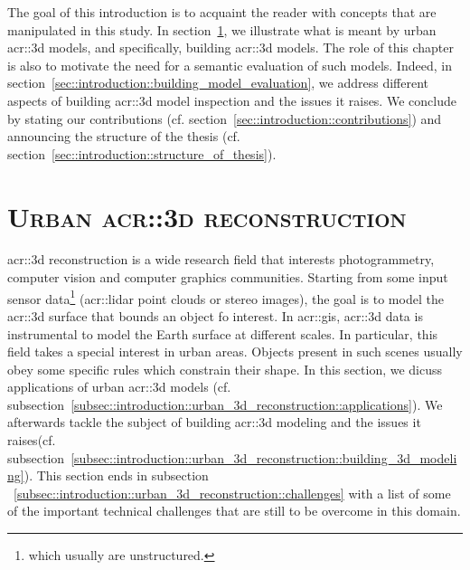 \minitoc

\vfill

The goal of this introduction is to acquaint the reader with concepts that are manipulated in this study.
In section~\ref{sec::introduction::urban_3d_reconstruction}, we illustrate what is meant by urban \gls{acr::3d} models, and specifically,  building \gls{acr::3d} models.
The role of this chapter is also to motivate the need for a semantic evaluation of such models.
Indeed, in section~\ref{sec::introduction::building_model_evaluation}, we address different aspects of building \gls{acr::3d} model inspection and the issues it raises.
We conclude by stating our contributions (cf. section~\ref{sec::introduction::contributions}) and announcing the structure of the thesis (cf. section~\ref{sec::introduction::structure_of_thesis}).

\clearpage

\section{\textsc{Urban \texorpdfstring{\acrshort*{acr::3d}}{3D} reconstruction}}
    \label{sec::introduction::urban_3d_reconstruction}
    \gls{acr::3d} reconstruction is a wide research field that interests photogrammetry, computer vision and computer graphics communities.
    Starting from some input sensor data\footnote{which usually are unstructured.} (\gls{acr::lidar} point clouds or stereo images), the goal is to model the \gls{acr::3d} surface that bounds an object fo interest.
    In \acrfull{acr::gis}, \gls{acr::3d} data is instrumental to model the Earth surface at different scales.
    In particular, this field takes a special interest in urban areas.
    Objects present in such scenes usually obey some specific rules which constrain their shape.
    In this section, we dicuss applications of urban \gls{acr::3d} models (cf. subsection~\ref{subsec::introduction::urban_3d_reconstruction::applications}).
    We afterwards tackle the subject of  building \gls{acr::3d} modeling and the issues it raises(cf. subsection~\ref{subsec::introduction::urban_3d_reconstruction::building_3d_modeling}).
    This section ends in subsection ~\ref{subsec::introduction::urban_3d_reconstruction::challenges} with a list of some of the important technical challenges that are still to be overcome in this domain.

